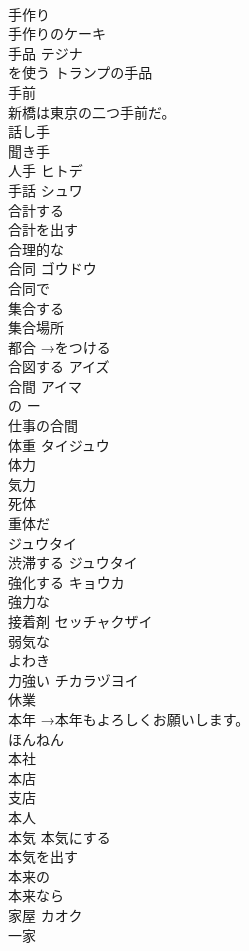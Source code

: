 \documentclass[8pt]{extreport}
\begin{document}
\begin{CJK}{UTF8}{min}
\\	手作り	
\\	手作りのケーキ
\\	手品	テジナ 
\\	を使う トランプの手品 
\\	手前	
\\	新橋は東京の二つ手前だ。
\\	話し手	
\\	聞き手	
\\	人手	ヒトデ 
\\	手話	シュワ 
\\	合計する	
\\	合計を出す 
\\	合理的な	
\\	合同	ゴウドウ 
\\	合同で 
\\	集合する	
\\	集合場所
\\	都合 →をつける	
\\	合図する	アイズ 
\\	合間	アイマ 
\\	の ー
\\	仕事の合間 
\\	体重	タイジュウ 
\\	体力	
\\	気力 
\\	死体	
\\	重体だ	
\\	ジュウタイ
\\	渋滞する	ジュウタイ
\\	強化する	キョウカ 
\\	強力な	
\\	接着剤	セッチャクザイ 
\\	弱気な	
\\	よわき
\\	力強い	チカラヅヨイ 
\\	休業	
\\	本年	→本年もよろしくお願いします。 
\\	ほんねん
\\	本社	
\\	本店	
\\	支店 
\\	本人	
\\	本気	本気にする 
\\	本気を出す 
\\	本来の
\\	本来なら 
\\	家屋	カオク 
\\	一家	

\end{CJK}
\end{document}
